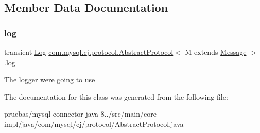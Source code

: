 \subsection{Member Data Documentation}
\mbox{\label{classcom_1_1mysql_1_1cj_1_1protocol_1_1_abstract_protocol_a3c27ad2f43100d6650c4a71b833190cc}} 
\subsubsection{\texorpdfstring{log}{log}}
{\footnotesize\ttfamily transient \mbox{\hyperlink{interfacecom_1_1mysql_1_1cj_1_1log_1_1_log}{Log}} \mbox{\hyperlink{classcom_1_1mysql_1_1cj_1_1protocol_1_1_abstract_protocol}{com.\+mysql.\+cj.\+protocol.\+Abstract\+Protocol}}$<$ M extends \mbox{\hyperlink{interfacecom_1_1mysql_1_1cj_1_1protocol_1_1_message}{Message}} $>$.log\hspace{0.3cm}{\ttfamily [protected]}}

The logger we\textquotesingle{}re going to use 

The documentation for this class was generated from the following file\+:\begin{DoxyCompactItemize}
\item 
pruebas/mysql-\/connector-\/java-\/8../src/main/core-\/impl/java/com/mysql/cj/protocol/Abstract\+Protocol.\+java\end{DoxyCompactItemize}
